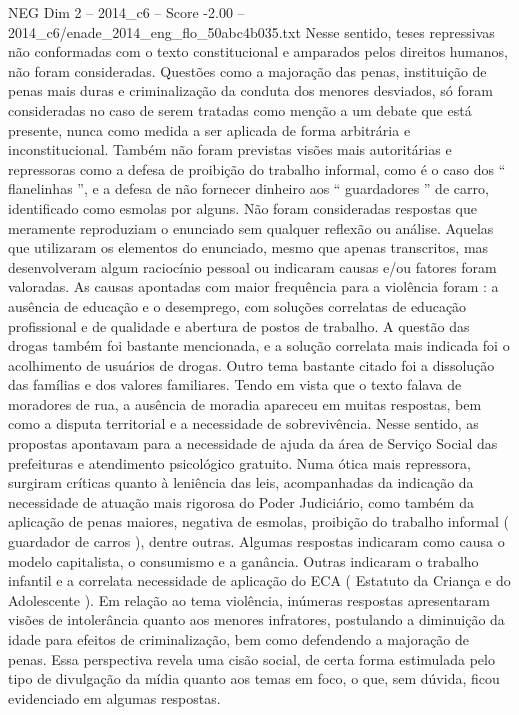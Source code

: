 \begin{textsample}{NEG Dim 2 – 2014\_c6 – Score -2.00 – 2014\_c6/enade\_2014\_eng\_flo\_50abc4b035.txt}
Nesse sentido, teses repressivas não conformadas com o texto constitucional e amparados pelos direitos humanos, não foram consideradas.
Questões como a majoração das penas, instituição de penas mais duras e criminalização da conduta dos menores desviados, só foram consideradas no caso de serem tratadas como menção a um debate que está presente, nunca como medida a ser aplicada de forma arbitrária e inconstitucional.
Também não foram previstas visões mais autoritárias e repressoras como a defesa de proibição do trabalho informal, como é o caso dos “ flanelinhas ”, e a defesa de não fornecer dinheiro aos “ guardadores ” de carro, identificado como esmolas por alguns.
Não foram consideradas respostas que meramente reproduziam o enunciado sem qualquer reflexão ou análise.
Aquelas que utilizaram os elementos do enunciado, mesmo que apenas transcritos, mas desenvolveram algum raciocínio pessoal ou indicaram causas e/ou fatores foram valoradas.
As causas apontadas com maior frequência para a violência foram : a ausência de educação e o desemprego, com soluções correlatas de educação profissional e de qualidade e abertura de postos de trabalho.
A questão das drogas também foi bastante mencionada, e a solução correlata mais indicada foi o acolhimento de usuários de drogas.
Outro tema bastante citado foi a dissolução das famílias e dos valores familiares.
Tendo em vista que o texto falava de moradores de rua, a ausência de moradia apareceu em muitas respostas, bem como a disputa territorial e a necessidade de sobrevivência.
Nesse sentido, as propostas apontavam para a necessidade de ajuda da área de Serviço Social das prefeituras e atendimento psicológico gratuito.
Numa ótica mais repressora, surgiram críticas quanto à leniência das leis, acompanhadas da indicação da necessidade de atuação mais rigorosa do Poder Judiciário, como também da aplicação de penas maiores, negativa de esmolas, proibição do trabalho informal ( guardador de carros ), dentre outras.
Algumas respostas indicaram como causa o modelo capitalista, o consumismo e a ganância.
Outras indicaram o trabalho infantil e a correlata necessidade de aplicação do ECA ( Estatuto da Criança e do Adolescente ).
Em relação ao tema violência, inúmeras respostas apresentaram visões de intolerância quanto aos menores infratores, postulando a diminuição da idade para efeitos de criminalização, bem como defendendo a majoração de penas.
Essa perspectiva revela uma cisão social, de certa forma estimulada pelo tipo de divulgação da mídia quanto aos temas em foco, o que, sem dúvida, ficou evidenciado em algumas respostas.

\end{textsample}
